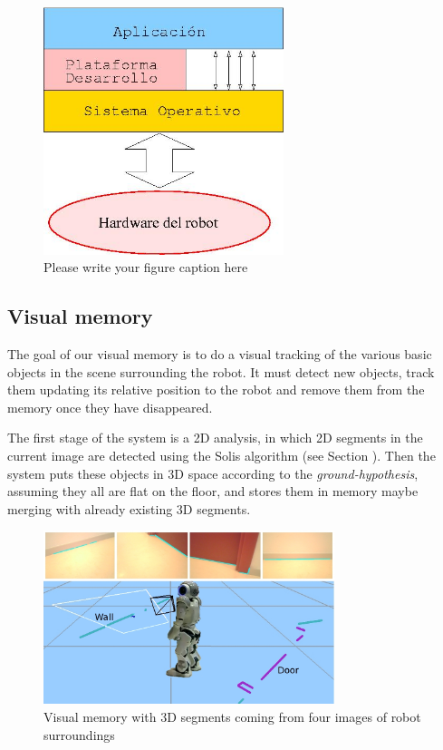 \documentclass[twocolumn]{svjour3}          %
\begin{document}
\begin{figure}
  \includegraphics[width=7cm]{figs/programacion3.jpg}
\caption{Please write your figure caption here}
\label{fig:2}       %
\end{figure}


\subsection{Visual memory}

The goal of our visual memory is to do a visual tracking of the various basic objects in the scene surrounding the robot. It must detect new objects, track them updating its relative position to the robot and remove them from the memory once they have disappeared.

The first stage of the system is a 2D analysis, in which 2D segments in the current image are detected using the Solis algorithm \cite{solis09} (see Section \label{subsec:visionlib}). Then the system puts these objects in 3D space according to the \textit{ground-hypothesis}, assuming they all are flat on the floor, and stores them in memory maybe merging with already existing 3D segments. 

\begin{figure}[h!]
\includegraphics[width=8.5cm]{figs/experimentoReal.jpg}
\caption{Visual memory with 3D segments coming from four images of robot surroundings}
\label{fig:memory}
\end{figure}
\end{document}
